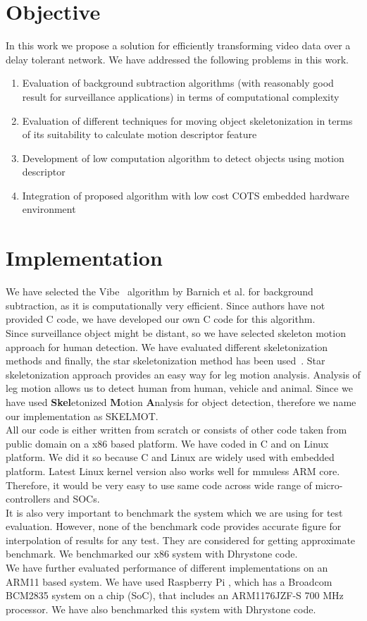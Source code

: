 \documentclass[a4paper, 12pt, twoside]{synopsis}  %
\begin{document}
\section{Objective}
\indent	In this work we propose a solution for efficiently transforming
video data   over   a delay   tolerant   network.  We have addressed
the following problems in this work.\\
\begin{enumerate}
\item Evaluation of background subtraction algorithms (with reasonably
good result for surveillance applications) in terms of computational
complexity 
\item Evaluation of different techniques for moving object
skeletonization in terms of its suitability to calculate motion
descriptor feature 
\item Development of low computation algorithm to detect objects using
motion descriptor
\item Integration of proposed algorithm with low cost COTS embedded
hardware environment
\end{enumerate}
\section{Implementation}
\indent We have selected the Vibe~\cite{9} algorithm by Barnich et al.
for background subtraction, as it is computationally very efficient.
Since authors have not provided C code, we have developed our own C code
for this algorithm.\\
\indent Since surveillance object might be distant, so we have selected
skeleton motion approach for human detection. We have evaluated
different skeletonization methods and finally, the star skeletonization
method has been used~\cite{32}. Star skeletonization approach provides
an easy way for leg motion analysis. Analysis of leg motion allows us to
detect human from human, vehicle and animal. Since we have used
\textbf{Skel}etonized \textbf{M}otion \textbf{A}nalysis for object
detection, therefore we name our implementation as SKELMOT.\\
\indent All our code is either written from scratch or consists of other
code taken from public domain on a x86 based platform. We have coded in
C and on Linux platform. We did it so because C and Linux are widely
used with embedded platform.  Latest Linux kernel version also works
well for mmuless ARM core.  Therefore, it would be very easy to use same
code across wide range of micro-controllers and SOCs.\\
\indent It is also very important to benchmark the system which we are
using for test evaluation. However, none of the benchmark code provides
accurate figure for interpolation of results for any test. They are
considered for getting approximate benchmark. We benchmarked our x86
system with Dhrystone code.\\
\indent We have further evaluated performance of different
implementations on an ARM11 based system. We have used Raspberry Pi ,
which has a Broadcom BCM2835 system on a chip (SoC), that includes an
ARM1176JZF-S 700 MHz processor. We have also benchmarked this system
with Dhrystone code.
\end{document}
